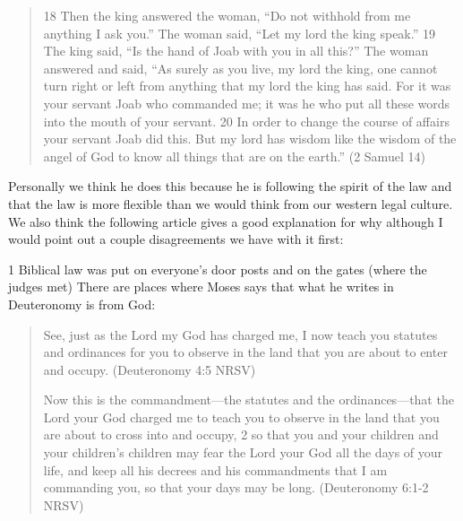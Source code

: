 \documentclass[11pt]{article}
\begin{document}
\begin{quote}
18 Then the king answered the woman, “Do not withhold from me anything I ask you.” The woman said, “Let my lord the king speak.” 19 The king said, “Is the hand of Joab with you in all this?” The woman answered and said, “As surely as you live, my lord the king, one cannot turn right or left from anything that my lord the king has said. For it was your servant Joab who commanded me; it was he who put all these words into the mouth of your servant. 20 In order to change the course of affairs your servant Joab did this. But my lord has wisdom like the wisdom of the angel of God to know all things that are on the earth.”
(2 Samuel 14)
\end{quote}

Personally we think he does this because he is following the spirit of the law and that the law is more flexible than we would think from our western legal culture. We also think the following article gives a good explanation for why although I would point out a couple disagreements we have with it first:

1 Biblical law was put on everyone's door posts and on the gates (where the judges met)
There are places where Moses says that what he writes in Deuteronomy is from God:
\begin{quote}
See, just as the Lord my God has charged me, I now teach you statutes and ordinances for you to observe in the land that you are about to enter and occupy.
(Deuteronomy 4:5 NRSV)

Now this is the commandment—the statutes and the ordinances—that the Lord your God charged me to teach you to observe in the land that you are about to cross into and occupy, 2 so that you and your children and your children’s children may fear the Lord your God all the days of your life, and keep all his decrees and his commandments that I am commanding you, so that your days may be long.
(Deuteronomy 6:1-2 NRSV)
\end{quote}
\end{document}
